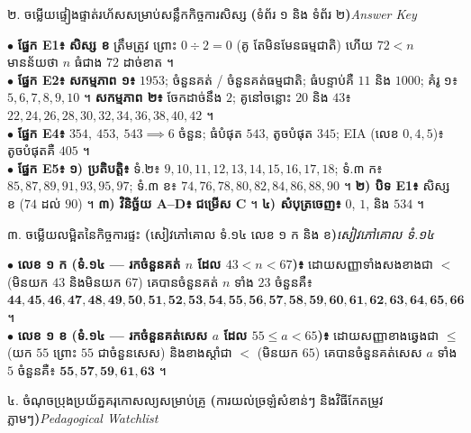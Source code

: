 \documentclass[a4paper,10pt]{article}
\newcommand{\en}[1]{{\TimesEn #1}}
\newcommand{\enbf}[1]{{\TimesEn\bfseries #1}}
\newcommand{\secstrip}[2]{%
  \vspace{3pt}%
  \begin{tcolorbox}[
    enhanced, sharp corners, colback=panelgray, colframe=black,
    boxrule=0.8pt, boxsep=0.8pt, top=2pt, bottom=2pt, left=5pt, right=5pt,
    after skip=3pt
  ]
    {\muol\fontsize{8.5pt}{12.2pt}\selectfont #1}\hfill{\fontsize{7.8pt}{10.8pt}\selectfont\textit{#2}}
  \end{tcolorbox}%
}
\begin{document}
\vfill
\secstrip{២. ចម្លើយផ្ទៀងផ្ទាត់រហ័សសម្រាប់សន្លឹកកិច្ចការសិស្ស \enbf{(}ទំព័រ ១ និង ទំព័រ ២\enbf{)}}{\en{Answer Key}}

\begin{tcolorbox}[
  enhanced, sharp corners, colback=white, colframe=black,
  boxrule=0.8pt, boxsep=2.5pt, top=4.5pt, bottom=4.5pt, left=6pt, right=6pt
]
  \fontsize{9.0pt}{13.6pt}\selectfont
  $\bullet$ \textbf{ផ្នែក \en{E1}៖} \textbf{សិស្ស ខ} ត្រឹមត្រូវ ព្រោះ $0 \div 2 = 0$ (គូ តែមិនមែនធម្មជាតិ) ហើយ $72 < n$ មានន័យថា $n$ ធំជាង $72$ ដាច់ខាត ។\\[2.5pt]
  $\bullet$ \textbf{ផ្នែក \en{E2}៖} \textbf{សកម្មភាព ១៖} $1953$; ចំនួនគត់ / ចំនួនគត់ធម្មជាតិ; ធំបន្ទាប់គឺ $11$ និង $1000$; គំរូ ១៖ $5, 6, 7, 8, 9, 10$ ។ \textbf{សកម្មភាព ២៖} ចែកដាច់នឹង $2$; គូនៅចន្លោះ $20$ និង $43$៖ $22, 24, 26, 28, 30, 32, 34, 36, 38, 40, 42$ ។\\[2.5pt]
  $\bullet$ \textbf{ផ្នែក \en{E4}៖} $354, \ 453, \ 543 \implies 6$ ចំនួន; ធំបំផុត $543$, តូចបំផុត $345$; \en{EIA} (លេខ $0, 4, 5$)៖ តូចបំផុតគឺ $405$ ។\\[2.5pt]
  $\bullet$ \textbf{ផ្នែក \en{E5}៖} \textbf{១) ប្រតិបត្តិ៖} ទំ.២៖ $9, 10, 11, 12, 13, 14, 15, 16, 17, 18$; ទំ.៣ ក៖ $85, 87, 89, 91, 93, 95, 97$; ទំ.៣ ខ៖ $74, 76, 78, 80, 82, 84, 86, 88, 90$ ។ \textbf{២) បិទ \en{E1}៖} សិស្ស ខ ($74$ ដល់ $90$) ។ \textbf{៣) វិនិច្ឆ័យ \en{A--D}៖} \textbf{ជម្រើស \en{C}} ។ \textbf{៤) សំបុត្រចេញ៖} $0$, $1$, និង $534$ ។
\end{tcolorbox}

\vfill
\secstrip{៣. ចម្លើយលម្អិតនៃកិច្ចការផ្ទះ \enbf{(}សៀវភៅគោល ទំ.១៤ លេខ ១ ក និង ខ\enbf{)}}{សៀវភៅគោល ទំ.១៤}

\begin{tcolorbox}[
  enhanced, sharp corners, colback=white, colframe=black,
  boxrule=0.8pt, boxsep=2.5pt, top=4.5pt, bottom=4.5pt, left=6pt, right=6pt
]
  \fontsize{8.9pt}{13.4pt}\selectfont
  $\bullet$ \textbf{លេខ ១ ក (ទំ.១៤ — រកចំនួនគត់ $n$ ដែល $43 < n < 67$)៖} ដោយសញ្ញាទាំងសងខាងជា $<$ (មិនយក $43$ និងមិនយក $67$) គេបានចំនួនគត់ $n$ ទាំង $23$ ចំនួនគឺ៖ $\mathbf{44, 45, 46, 47, 48, 49, 50, 51, 52, 53, 54, 55, 56, 57, 58, 59, 60, 61, 62, 63, 64, 65, 66}$ ។\\[3pt]
  $\bullet$ \textbf{លេខ ១ ខ (ទំ.១៤ — រកចំនួនគត់សេស $a$ ដែល $55 \le a < 65$)៖} ដោយសញ្ញាខាងឆ្វេងជា $\le$ (យក $55$ ព្រោះ $55$ ជាចំនួនសេស) និងខាងស្ដាំជា $<$ (មិនយក $65$) គេបានចំនួនគត់សេស $a$ ទាំង $5$ ចំនួនគឺ៖ $\mathbf{55, 57, 59, 61, 63}$ ។
\end{tcolorbox}

\vfill
\secstrip{៤. ចំណុចប្រុងប្រយ័ត្នគរុកោសល្យសម្រាប់គ្រូ \enbf{(}ការយល់ច្រឡំសំខាន់ៗ និងវិធីកែតម្រូវភ្លាមៗ\enbf{)}}{\en{Pedagogical Watchlist}}
\end{document}
